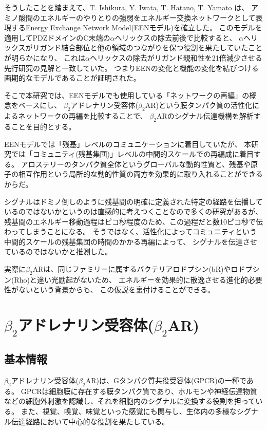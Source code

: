 そうしたことを踏まえて、T. Ishikura, Y. Iwata, T. Hatano, T. Yamato は、
アミノ酸間のエネルギーのやりとりの強弱をエネルギー交換ネットワークとして表現するEnergy Exchange Network Model(EENモデル)を確立\cite{Ishikura2015}した。
このモデルを適用してPDZドメインのC末端の$\alpha$ヘリックスの除去前後で比較すると、
$\alpha$ヘリックスがリガンド結合部位と他の領域のつながりを保つ役割を果たしていたことが明らかになり、
これは$\alpha$ヘリックスの除去がリガンド親和性を21倍減少させる先行研究の見解と一致していた。
つまりEENの変化と機能の変化を結びつける画期的なモデルであることが証明された。


そこで本研究では、EENモデルでも使用している「ネットワークの再編」の概念をベースにし、
$\beta_2$アドレナリン受容体($\beta_2$AR)という膜タンパク質の活性化によるネットワークの再編を比較することで、
$\beta_2$ARのシグナル伝達機構を解析することを目的とする。

EENモデルでは「残基」レベルのコミュニケーションに着目していたが、
本研究では「コミュニティ(残基集団)」レベルの中間的スケールでの再編成に着目する。
アロステリーのタンパク質全体というグローバルな動的性質と、残基や原子の相互作用という局所的な動的性質の両方を効果的に取り入れることができるからだ。

シグナルはドミノ倒しのように残基間の明確に定義された特定の経路を伝播しているのではないかというのは直感的に考えつくことなので多くの研究があるが、
残基間のエネルギー移動過程はピコ秒程度のため、この過程だと数10ピコ秒で伝わってしまうことになる。
そうではなく、活性化によってコミュニティという中間的スケールの残基集団の時間のかかる再編によって、
シグナルを伝達させているのではないかと推測した。

実際に$\beta_2$ARは、同じファミリーに属するバクテリアロドプシン(bR)やロドプシン(Rho)と違い光励起がないため、
エネルギーを効果的に散逸させる進化的必要性がない\cite{Helmer2022}という背景からも、
この仮説を裏付けることができる。

\section{$\beta_2$アドレナリン受容体($\beta_2$AR)}
\label{sec:b2ar}

\subsection{基本情報}
$\beta_2$アドレナリン受容体($\beta_2$AR)は、Gタンパク質共役受容体(GPCR)の一種である。
GPCRは細胞膜に存在する膜タンパク質であり、ホルモンや神経伝達物質などの細胞外刺激を認識し、それを細胞内のシグナルに変換する役割を担っている。
また、視覚、嗅覚、味覚といった感覚にも関与し、生体内の多様なシグナル伝達経路において中心的な役割を果たしている。

